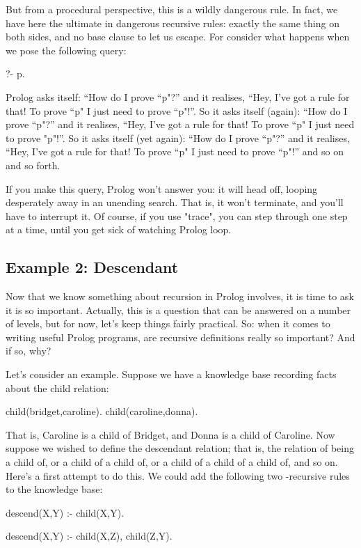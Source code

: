But from a procedural perspective, this is a wildly dangerous rule. In
fact, we have here the ultimate in dangerous recursive rules: exactly
the same thing on both sides, and no base clause to let us escape.
For consider what happens when we pose the following query:
\begin{LPNcodedisplay}
?- p.
\end{LPNcodedisplay}
Prolog asks itself: ``How do I prove ``p"?''  and it realises, ``Hey,
I've got a rule for that!  To prove ``p" I just need to prove ``p"!''.
So it asks itself (again): ``How do I prove ``p"?''  and it realises,
``Hey, I've got a rule for that!  To prove ``p" I just need to prove
"p"!''.  So it asks itself (yet again): ``How do I prove ``p"?''  and
it realises, ``Hey, I've got a rule for that!  To prove ``p" I just
need to prove ``p"!''  and so on and so forth.

If you make this query, Prolog won't answer you: it will head off,
looping desperately away in an unending search.  That is, it won't
terminate, and you'll have to interrupt it. Of course, if you use
"trace", you can step through one step at a time, until you get
sick of watching Prolog loop.

\subsection*{Example 2: Descendant}\label{SUBSEC.L3.EX2}



Now that we know something about  recursion in Prolog
involves, it is time to ask  it is so important.  Actually,
this is a question that can be answered on a number of levels, but for
now, let's keep things fairly practical.  So: when it comes to writing
useful Prolog programs, are recursive definitions really so important?
And if so, why?

Let's consider an example.  Suppose we have a knowledge base recording
facts about the child relation:
\begin{LPNcodedisplay}
child(bridget,caroline).
child(caroline,donna).
\end{LPNcodedisplay}
That is, Caroline is a child of Bridget, and Donna is a child of
Caroline. Now suppose we wished to define the descendant relation;
that is, the relation of being a child of, or a child of a child of,
or a child of a child of a child of, and so on.  Here's a first attempt to
do this.  We could add the following two -recursive rules to
the knowledge base:
\begin{LPNcodedisplay}
descend(X,Y) :- child(X,Y).

descend(X,Y) :- child(X,Z),
                 child(Z,Y).
\end{LPNcodedisplay}


